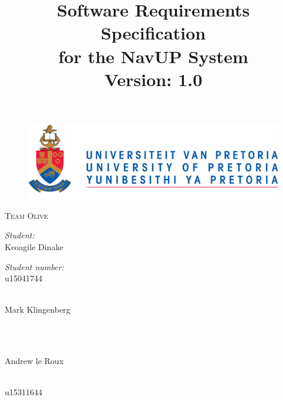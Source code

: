 \documentclass[english]{article}
\title{Software Requirements Specification\\
	for the NavUP System\\
	\small Version: 1.0}
\begin{document}
	\maketitle
	\begin{figure}[!t]
		\includegraphics{up_logo.png}
	\end{figure}
	
\begin{center}
\textsc{\Large Team Olive}\\[1cm]


\begin{minipage}{0.4\textwidth}
	\begin{flushleft} \large
		\emph{Student:}\\[0.75cm]
		Keoagile {Dinake}
	\end{flushleft}
\end{minipage}
\begin{minipage}{0.4\textwidth}
	\begin{flushright} \large
		\emph{Student number:} \\[0.75cm]
		u15041744
	\end{flushright}
\end{minipage}


\begin{minipage}{0.4\textwidth}
	\begin{flushleft} \large
		\emph{} \\
		Mark {Klingenberg }
	\end{flushleft}
\end{minipage}
\begin{minipage}{0.4\textwidth}
	\begin{flushright} \large
		\emph{} \\
		
	\end{flushright}
\end{minipage}


\begin{minipage}{0.4\textwidth}
	\begin{flushleft} \large
		\emph{} \\
		Andrew {le Roux}
	\end{flushleft}
\end{minipage}
\begin{minipage}{0.4\textwidth}
	\begin{flushright} \large
		\emph{} \\
		u15311644
	\end{flushright}
\end{minipage}


\end{center}
\end{document}
